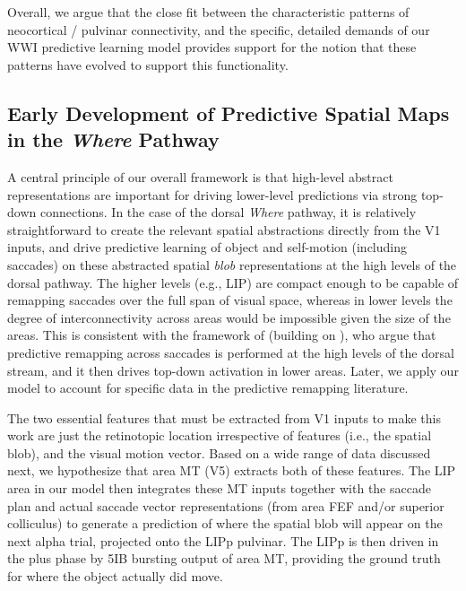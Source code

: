 \documentclass[11pt,twoside]{article}
\newif\myifpdf
\begin{document}
Overall, we argue that the close fit between the characteristic patterns of neocortical /  pulvinar connectivity, and the specific, detailed demands of our WWI predictive learning model provides support for the notion that these patterns have evolved to support this functionality.

\subsection{Early Development of Predictive Spatial Maps in the \emph{Where} Pathway}

A central principle of our overall framework is that high-level abstract representations are important for driving lower-level predictions via strong top-down connections.  In the case of the dorsal {\em Where} pathway, it is relatively straightforward to create the relevant spatial abstractions directly from the V1 inputs, and drive predictive learning of object and self-motion (including saccades) on these abstracted spatial {\em blob} representations at the high levels of the dorsal pathway.  The higher levels (e.g., LIP) are compact enough to be capable of remapping saccades over the full span of visual space, whereas in lower levels the degree of interconnectivity across areas would be impossible given the size of the areas.  This is consistent with the framework of  (building on ), who argue that predictive remapping across saccades is performed at the high levels of the dorsal stream, and it then drives top-down activation in lower areas.  Later, we apply our model to account for specific data in the predictive remapping literature.

The two essential features that must be extracted from V1 inputs to make this work are just the retinotopic location irrespective of features (i.e., the spatial blob), and the visual motion vector.  Based on a wide range of data discussed next, we hypothesize that area MT (V5) extracts both of these features.  The LIP area in our model then integrates these MT inputs together with the saccade plan and actual saccade vector representations (from area FEF and/or superior colliculus) to generate a prediction of where the spatial blob will appear on the next alpha trial, projected onto the LIPp pulvinar.  The LIPp is then driven in the plus phase by 5IB bursting output of area MT, providing the ground truth for where the object actually did move.
\end{document}
